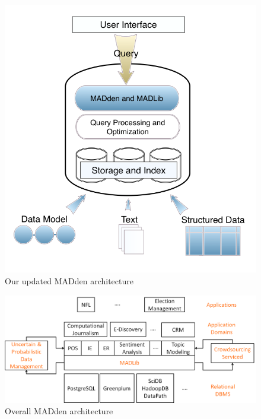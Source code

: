 \documentclass[11pt,onecolumn]{article}
\newcommand{\system}{MADden\xspace}
\begin{document}
  \begin{figure}
    \begin{center}
      \includegraphics[scale=0.4]{arch.png}
      \caption{{Our updated \system} architecture}
      \label{fig:arch}
    \end{center}
  \end{figure}


  \begin{figure}
    \begin{center}
      \includegraphics[scale=0.3]{altachitecture.png}
      \caption{Overall {\system} architecture}
      \label{fig:altarch}
    \end{center}
  \end{figure}
\end{document}
